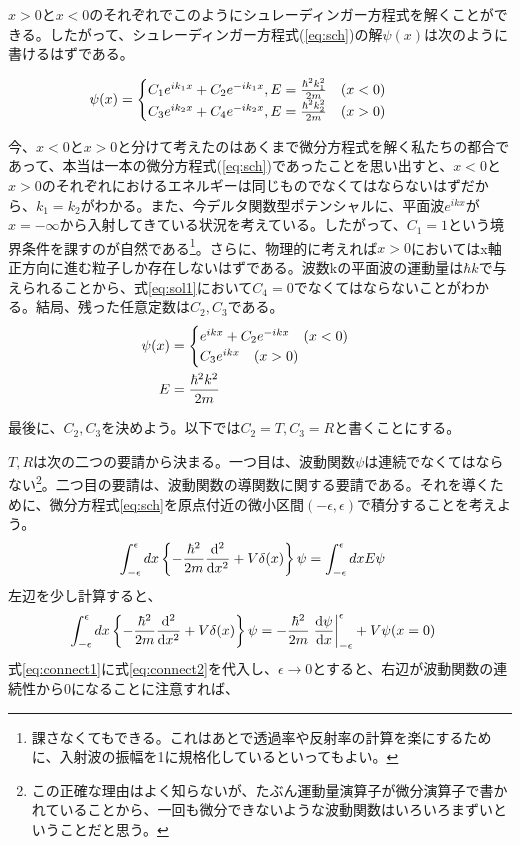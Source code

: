 \documentclass[uplatex,dvipdfmx]{jsarticle}
\begin{document}
$x>0$と$x<0$のそれぞれでこのようにシュレーディンガー方程式を解くことができる。したがって、シュレーディンガー方程式(\ref{eq:sch})の解$\psi(x)$は次のように書けるはずである。

\begin{align}
    \psi(x) &= \begin{cases}
        C_1 e^{ik_1x} + C_2 e^{-ik_1x}, E=\frac{\hbar^2k_1^2}{2m}  \qq{$(x<0)$} \\
        C_3 e^{ik_2x} + C_4 e^{-ik_2x}, E=\frac{\hbar^2k_2^2}{2m}  \qq{$(x>0)$} \label{eq:sol1}
    \end{cases}    
\end{align}

今、$x<0$と$x>0$と分けて考えたのはあくまで微分方程式を解く私たちの都合であって、本当は一本の微分方程式(\ref{eq:sch})であったことを思い出すと、$x<0$と$x>0$のそれぞれにおけるエネルギーは同じものでなくてはならないはずだから、$k_1 = k_2$がわかる。また、今デルタ関数型ポテンシャルに、平面波$e^{ikx}$が$x=-\infty$から入射してきている状況を考えている。したがって、$C_1=1$という境界条件を課すのが自然である\footnote{課さなくてもできる。これはあとで透過率や反射率の計算を楽にするために、入射波の振幅を1に規格化しているといってもよい。}。さらに、物理的に考えれば$x>0$においてはx軸正方向に進む粒子しか存在しないはずである。波数kの平面波の運動量は$\hbar k$で与えられることから、式\ref{eq:sol1}において$C_4=0$でなくてはならないことがわかる。結局、残った任意定数は$C_2, C_3$である。
\begin{align}
    \psi(x) &= \begin{cases}
        e^{ikx} + C_2 e^{-ikx} \qq{$(x<0)$} \\
        C_3 e^{ikx} \qq{$(x>0)$} \label{eq:sol2}
    \end{cases} \\
    E &= \frac{\hbar^2k^2}{2m}
\end{align}


\vspace{0.5cm}

最後に、$C_2, C_3$を決めよう。以下では$C_2 = T, C_3 = R$と書くことにする。

$T, R$は次の二つの要請から決まる。一つ目は、波動関数$\psi$は連続でなくてはならない\footnote{この正確な理由はよく知らないが、たぶん運動量演算子が微分演算子で書かれていることから、一回も微分できないような波動関数はいろいろまずいということだと思う。}。二つ目の要請は、波動関数の導関数に関する要請である。それを導くために、微分方程式\ref{eq:sch}を原点付近の微小区間$(-\epsilon, \epsilon)$で積分することを考えよう。
\begin{align}
    \int_{-\epsilon}^{\epsilon}dx \left\{-\frac{\hbar^2}{2m} \dv[2]{}{x} + V\delta(x) \right\}\psi &= \int_{-\epsilon}^{\epsilon} dx E\psi \label{eq:connect1}
\end{align}
左辺を少し計算すると、
\begin{align}
    \int_{-\epsilon}^{\epsilon} dx \left\{-\frac{\hbar^2}{2m} \dv[2]{}{x} + V\delta(x) \right\}\psi &= 
        -\frac{\hbar^2}{2m} \eval{\dv{\psi}{x}}_{-\epsilon}^{\epsilon} + V\psi(x=0) \label{eq:connect2}
\end{align}
式\ref{eq:connect1}に式\ref{eq:connect2}を代入し、$\epsilon \rightarrow 0$とすると、右辺が波動関数の連続性から0になることに注意すれば、
\end{document}
